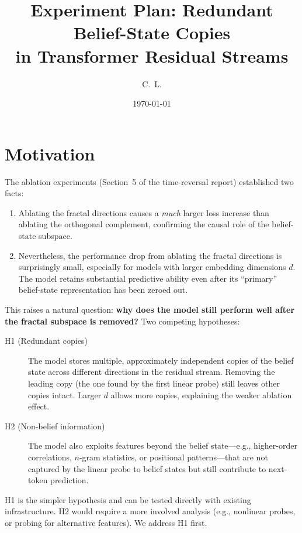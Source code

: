 \documentclass[11pt]{article}
\title{Experiment Plan: Redundant Belief-State Copies\\in Transformer Residual Streams}
\author{C.~L.}
\date{\today}
\begin{document}
\maketitle

\section{Motivation}

The ablation experiments (Section~5 of the time-reversal report) established two facts:
\begin{enumerate}
  \item Ablating the fractal directions causes a \emph{much} larger loss increase than ablating the orthogonal complement, confirming the causal role of the belief-state subspace.
  \item Nevertheless, the performance drop from ablating the fractal directions is surprisingly small, especially for models with larger embedding dimensions $d$.  The model retains substantial predictive ability even after its ``primary'' belief-state representation has been zeroed out.
\end{enumerate}

This raises a natural question: \textbf{why does the model still perform well after the fractal subspace is removed?}  Two competing hypotheses:

\begin{description}
  \item[H1 (Redundant copies)] The model stores multiple, approximately independent copies of the belief state across different directions in the residual stream.  Removing the leading copy (the one found by the first linear probe) still leaves other copies intact.  Larger $d$ allows more copies, explaining the weaker ablation effect.

  \item[H2 (Non-belief information)] The model also exploits features beyond the belief state---e.g., higher-order correlations, $n$-gram statistics, or positional patterns---that are not captured by the linear probe to belief states but still contribute to next-token prediction.
\end{description}

H1 is the simpler hypothesis and can be tested directly with existing infrastructure.  H2 would require a more involved analysis (e.g., nonlinear probes, or probing for alternative features).  We address H1 first.
\end{document}
